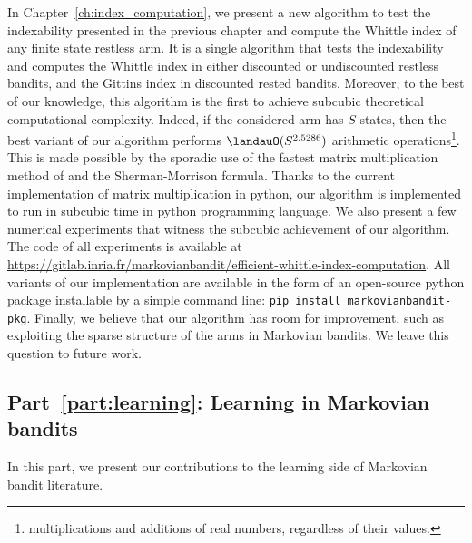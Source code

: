 In Chapter~\ref{ch:index_computation}, we present a new algorithm to test the indexability presented in the previous chapter and compute the Whittle index of any finite state restless arm.
It is a single algorithm that tests the indexability and computes the Whittle index in either discounted or undiscounted restless bandits, and the Gittins index in discounted rested bandits.
Moreover, to the best of our knowledge, this algorithm is the first to achieve subcubic theoretical computational complexity.
Indeed, if the considered arm has $S$ states, then the best variant of our algorithm performs $\landauO(S^{2.5286})$ arithmetic operations\footnote{multiplications and additions of real numbers, regardless of their values.}.
This is made possible by the sporadic use of the fastest matrix multiplication method of \cite{coppersmith1987matrix} and the Sherman-Morrison formula.
Thanks to the current implementation of matrix multiplication in python, our algorithm is implemented to run in subcubic time in python programming language.
We also present a few numerical experiments that witness the subcubic achievement of our algorithm.
The code of all experiments is available at \url{https://gitlab.inria.fr/markovianbandit/efficient-whittle-index-computation}.
All variants of our implementation are available in the form of an open-source python package installable by a simple command line: \texttt{pip install markovianbandit-pkg}.
Finally, we believe that our algorithm has room for improvement, such as exploiting the sparse structure of the arms in Markovian bandits. We leave this question to future work.

\subsection{Part~{\ref{part:learning}}: Learning in Markovian bandits}

In this part, we present our contributions to the learning side of Markovian bandit literature.

